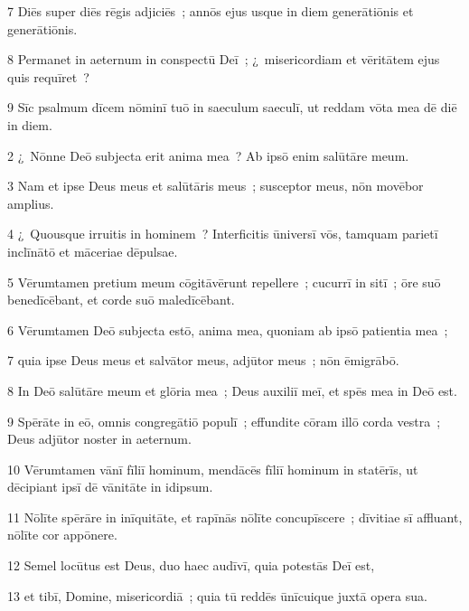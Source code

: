 \psalmVerse
  {\phantom{00}7}
  {Diēs super diēs rēgis adjiciēs~; annōs ejus usque in diem generātiōnis et generātiōnis.}


\psalmVerse
  {\phantom{00}8}
  {Permanet in aeternum in conspectū Deī~; ¿~misericordiam et vēritātem ejus quis requīret~?}


\psalmVerse
  {\phantom{00}9}
  {Sīc psalmum dīcem nōminī tuō in saeculum saeculī, ut reddam vōta mea dē diē in diem.}




\psalmVerse
  {\phantom{00}2}
  {¿~Nōnne Deō subjecta erit anima mea~? Ab ipsō enim salūtāre meum.}


\psalmVerse
  {\phantom{00}3}
  {Nam et ipse Deus meus et salūtāris meus~; susceptor meus, nōn movēbor amplius.}


\psalmVerse
  {\phantom{00}4}
  {¿~Quousque irruitis in hominem~? Interficitis ūniversī vōs, tamquam parietī inclīnātō et māceriae dēpulsae.}


\psalmVerse
  {\phantom{00}5}
  {Vērumtamen pretium meum cōgitāvērunt repellere~; cucurrī in sitī~; ōre suō benedīcēbant, et corde suō maledīcēbant.}


\psalmVerse
  {\phantom{00}6}
  {Vērumtamen Deō subjecta estō, anima mea, quoniam ab ipsō patientia mea~;}


\psalmVerse
  {\phantom{00}7}
  {quia ipse Deus meus et salvātor meus, adjūtor meus~; nōn ēmigrābō.}


\psalmVerse
  {\phantom{00}8}
  {In Deō salūtāre meum et glōria mea~; Deus auxiliī meī, et spēs mea in Deō est.}


\psalmVerse
  {\phantom{00}9}
  {Spērāte in eō, omnis congregātiō populī~; effundite cōram illō corda vestra~; Deus adjūtor noster in aeternum.}


\psalmVerse
  {\phantom{0}10}
  {Vērumtamen vānī fīliī hominum, mendācēs fīliī hominum in statērīs, ut dēcipiant ipsī dē vānitāte in idipsum.}


\psalmVerse
  {\phantom{0}11}
  {Nōlīte spērāre in inīquitāte, et rapīnās nōlīte concupīscere~; dīvitiae sī affluant, nōlīte cor appōnere.}


\psalmVerse
  {\phantom{0}12}
  {Semel locūtus est Deus, duo haec audīvī, quia potestās Deī est,}


\psalmVerse
  {\phantom{0}13}
  {et tibī, Domine, misericordiā~; quia tū reddēs ūnīcuique juxtā opera sua.}


